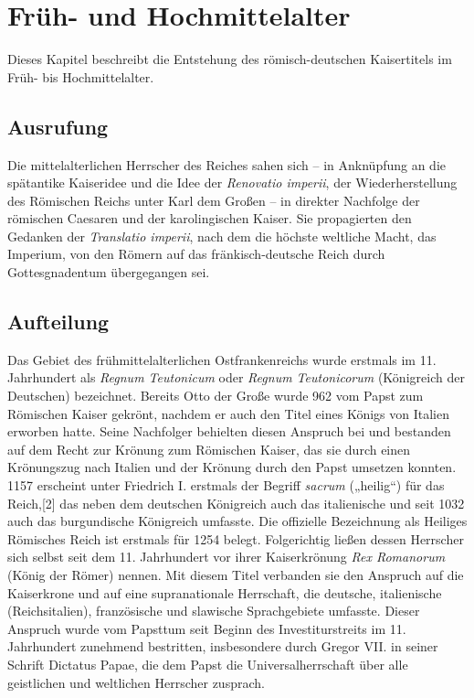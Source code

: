
\chapter{Früh- und Hochmittelalter}
\label{chapter-basics}

Dieses Kapitel beschreibt die Entstehung des römisch-deutschen Kaisertitels im Früh- bis Hochmittelalter.

\section{Ausrufung}

Die mittelalterlichen Herrscher des Reiches sahen sich – in Anknüpfung an die spätantike Kaiseridee und die Idee der \textit{Renovatio imperii}, der Wiederherstellung des Römischen Reichs unter Karl dem Großen – in direkter Nachfolge der römischen Caesaren und der karolingischen Kaiser. Sie propagierten den Gedanken der \textit{Translatio imperii}, nach dem die höchste weltliche Macht, das Imperium, von den Römern auf das fränkisch-deutsche Reich durch Gottesgnadentum übergegangen sei.

\section{Aufteilung}

Das Gebiet des frühmittelalterlichen Ostfrankenreichs wurde erstmals im 11. Jahrhundert als \textit{Regnum Teutonicum} oder \textit{Regnum Teutonicorum} (Königreich der Deutschen) bezeichnet. Bereits Otto der Große wurde 962 vom Papst zum Römischen Kaiser gekrönt, nachdem er auch den Titel eines Königs von Italien erworben hatte. Seine Nachfolger behielten diesen Anspruch bei und bestanden auf dem Recht zur Krönung zum Römischen Kaiser, das sie durch einen Krönungszug nach Italien und der Krönung durch den Papst umsetzen konnten. 1157 erscheint unter Friedrich I. erstmals der Begriff \textit{sacrum} („heilig“) für das Reich,[2] das neben dem deutschen Königreich auch das italienische und seit 1032 auch das burgundische Königreich umfasste. Die offizielle Bezeichnung als Heiliges Römisches Reich ist erstmals für 1254 belegt. Folgerichtig ließen dessen Herrscher sich selbst seit dem 11. Jahrhundert vor ihrer Kaiserkrönung \textit{Rex Romanorum} (König der Römer) nennen. Mit diesem Titel verbanden sie den Anspruch auf die Kaiserkrone und auf eine supranationale Herrschaft, die deutsche, italienische (Reichsitalien), französische und slawische Sprachgebiete umfasste. Dieser Anspruch wurde vom Papsttum seit Beginn des Investiturstreits im 11. Jahrhundert zunehmend bestritten, insbesondere durch Gregor VII. in seiner Schrift Dictatus Papae, die dem Papst die Universalherrschaft über alle geistlichen und weltlichen Herrscher zusprach.

